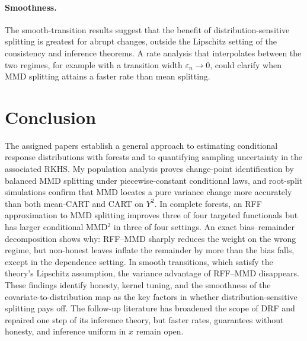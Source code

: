 \documentclass[12pt,a4paper]{article}
\newcommand{\1}{\mathbf 1}
\begin{document}
\paragraph{Smoothness.}
The smooth-transition results suggest that the benefit of distribution-sensitive splitting is greatest for abrupt changes, outside the Lipschitz setting of the consistency and inference theorems. A rate analysis that interpolates between the two regimes, for example with a transition width $\varepsilon_n\to0$, could clarify when MMD splitting attains a faster rate than mean splitting.

\section{Conclusion}\label{sec:conclusion}
The assigned papers establish a general approach to estimating conditional response distributions with forests and to quantifying sampling uncertainty in the associated RKHS. My population analysis proves change-point identification by balanced MMD splitting under piecewise-constant conditional laws, and root-split simulations confirm that MMD locates a pure variance change more accurately than both mean-CART and CART on $Y^2$. In complete forests, an RFF approximation to MMD splitting improves three of four targeted functionals but has larger conditional MMD$^2$ in three of four settings. An exact bias--remainder decomposition shows why: RFF--MMD sharply reduces the weight on the wrong regime, but non-honest leaves inflate the remainder by more than the bias falls, except in the dependence setting. In smooth transitions, which satisfy the theory's Lipschitz assumption, the variance advantage of RFF--MMD disappears. These findings identify honesty, kernel tuning, and the smoothness of the covariate-to-distribution map as the key factors in whether distribution-sensitive splitting pays off. The follow-up literature has broadened the scope of DRF and repaired one step of its inference theory, but faster rates, guarantees without honesty, and inference uniform in $x$ remain open.

\appendix
\end{document}
